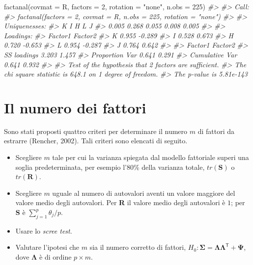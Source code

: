 \documentclass[
  11pt,
]{krantz}
\makeatletter
\newenvironment{Shaded}{\begin{snugshade}}{\end{snugshade}}
\newcommand{\AttributeTok}[1]{\textcolor[rgb]{0.61,0.61,0.61}{#1}}
\newcommand{\CommentTok}[1]{\textcolor[rgb]{0.37,0.37,0.37}{\textit{#1}}}
\newcommand{\DecValTok}[1]{\textcolor[rgb]{0.06,0.06,0.06}{#1}}
\newcommand{\FunctionTok}[1]{\textcolor[rgb]{0,0,0}{#1}}
\newcommand{\NormalTok}[1]{#1}
\newcommand{\StringTok}[1]{\textcolor[rgb]{0.5,0.5,0.5}{#1}}
\providecommand{\tightlist}{%
  \setlength{\itemsep}{0pt}\setlength{\parskip}{0pt}}
\newenvironment{kframe}{%
\medskip{}
\setlength{\fboxsep}{.8em}
 \def\at@end@of@kframe{}%
 \ifinner\ifhmode%
  \def\at@end@of@kframe{\end{minipage}}%
  \begin{minipage}{\columnwidth}%
 \fi\fi%
 \def\FrameCommand##1{\hskip\@totalleftmargin \hskip-\fboxsep
 \colorbox{shadecolor}{##1}\hskip-\fboxsep
     \hskip-\linewidth \hskip-\@totalleftmargin \hskip\columnwidth}%
 \MakeFramed {\advance\hsize-\width
   \@totalleftmargin\z@ \linewidth\hsize
   \@setminipage}}%
 {\par\unskip\endMakeFramed%
 \at@end@of@kframe}
\renewenvironment{Shaded}{\begin{kframe}}{\end{kframe}}
\theoremstyle{definition}
\theoremstyle{definition}
\theoremstyle{definition}
\theoremstyle{definition}
\theoremstyle{remark}
\makeatother
\begin{document}
\begin{Shaded}
\begin{Highlighting}[]
\FunctionTok{factanal}\NormalTok{(}\AttributeTok{covmat =}\NormalTok{ R, }\AttributeTok{factors =} \DecValTok{2}\NormalTok{, }\AttributeTok{rotation =} \StringTok{"none"}\NormalTok{, }\AttributeTok{n.obs =} \DecValTok{225}\NormalTok{)}
\CommentTok{\#\textgreater{} }
\CommentTok{\#\textgreater{} Call:}
\CommentTok{\#\textgreater{} factanal(factors = 2, covmat = R, n.obs = 225, rotation = "none")}
\CommentTok{\#\textgreater{} }
\CommentTok{\#\textgreater{} Uniquenesses:}
\CommentTok{\#\textgreater{}     K     I     H     L     J }
\CommentTok{\#\textgreater{} 0.005 0.268 0.055 0.008 0.005 }
\CommentTok{\#\textgreater{} }
\CommentTok{\#\textgreater{} Loadings:}
\CommentTok{\#\textgreater{}   Factor1 Factor2}
\CommentTok{\#\textgreater{} K  0.955  {-}0.289 }
\CommentTok{\#\textgreater{} I  0.528   0.673 }
\CommentTok{\#\textgreater{} H  0.720  {-}0.653 }
\CommentTok{\#\textgreater{} L  0.954  {-}0.287 }
\CommentTok{\#\textgreater{} J  0.764   0.642 }
\CommentTok{\#\textgreater{} }
\CommentTok{\#\textgreater{}                Factor1 Factor2}
\CommentTok{\#\textgreater{} SS loadings      3.203   1.457}
\CommentTok{\#\textgreater{} Proportion Var   0.641   0.291}
\CommentTok{\#\textgreater{} Cumulative Var   0.641   0.932}
\CommentTok{\#\textgreater{} }
\CommentTok{\#\textgreater{} Test of the hypothesis that 2 factors are sufficient.}
\CommentTok{\#\textgreater{} The chi square statistic is 648.1 on 1 degree of freedom.}
\CommentTok{\#\textgreater{} The p{-}value is 5.81e{-}143}
\end{Highlighting}
\end{Shaded}

\hypertarget{ch:numero_fattori}{%
\chapter{Il numero dei fattori}\label{ch:numero_fattori}}

Sono stati proposti quattro criteri per determinare il numero \(m\) di fattori da estrarre (Rencher, 2002). Tali criteri sono elencati di seguito.

\begin{itemize}
\tightlist
\item
  Scegliere \(m\) tale per cui la varianza spiegata dal modello fattoriale superi una soglia predeterminata, per esempio l'80\% della varianza totale, \(tr(\textbf{S})\) o \(tr(\textbf{R})\).
\item
  Scegliere \(m\) uguale al numero di autovalori aventi un valore maggiore del valore medio degli autovalori. Per \textbf{R} il valore medio degli autovalori è \(1\); per \textbf{S} è \(\sum_{j=1}^p \theta_j/p\).
\item
  Usare lo \emph{scree test}.
\item
  Valutare l'ipotesi che \(m\) sia il numero corretto di fattori, \(H_0: \boldsymbol{\Sigma} = \boldsymbol{\Lambda}  \boldsymbol{\Lambda}^{\ensuremath{\mathsf{T}}} + \boldsymbol{\Psi}\), dove \(\boldsymbol{\Lambda}\) è di ordine \(p \times m\).
\end{itemize}
\end{document}
